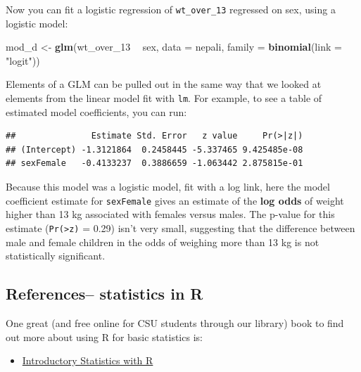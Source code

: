\documentclass[]{book}
\makeatletter
\newenvironment{Shaded}{\begin{snugshade}}{\end{snugshade}}
\newcommand{\KeywordTok}[1]{\textcolor[rgb]{0.13,0.29,0.53}{\textbf{#1}}}
\newcommand{\DataTypeTok}[1]{\textcolor[rgb]{0.13,0.29,0.53}{#1}}
\newcommand{\DecValTok}[1]{\textcolor[rgb]{0.00,0.00,0.81}{#1}}
\newcommand{\StringTok}[1]{\textcolor[rgb]{0.31,0.60,0.02}{#1}}
\newcommand{\OperatorTok}[1]{\textcolor[rgb]{0.81,0.36,0.00}{\textbf{#1}}}
\newcommand{\NormalTok}[1]{#1}
\providecommand{\tightlist}{%
  \setlength{\itemsep}{0pt}\setlength{\parskip}{0pt}}
\newenvironment{kframe}{%
\medskip{}
\setlength{\fboxsep}{.8em}
 \def\at@end@of@kframe{}%
 \ifinner\ifhmode%
  \def\at@end@of@kframe{\end{minipage}}%
  \begin{minipage}{\columnwidth}%
 \fi\fi%
 \def\FrameCommand##1{\hskip\@totalleftmargin \hskip-\fboxsep
 \colorbox{shadecolor}{##1}\hskip-\fboxsep
     \hskip-\linewidth \hskip-\@totalleftmargin \hskip\columnwidth}%
 \MakeFramed {\advance\hsize-\width
   \@totalleftmargin\z@ \linewidth\hsize
   \@setminipage}}%
 {\par\unskip\endMakeFramed%
 \at@end@of@kframe}
\renewenvironment{Shaded}{\begin{kframe}}{\end{kframe}}
\theoremstyle{definition}
\theoremstyle{definition}
\theoremstyle{definition}
\theoremstyle{remark}
\makeatother
\begin{document}
Now you can fit a logistic regression of \texttt{wt\_over\_13} regressed
on sex, using a logistic model:

\begin{Shaded}
\begin{Highlighting}[]
\NormalTok{mod_d <-}\StringTok{ }\KeywordTok{glm}\NormalTok{(wt_over_}\DecValTok{13} \OperatorTok{~}\StringTok{ }\NormalTok{sex, }\DataTypeTok{data =}\NormalTok{ nepali,}
             \DataTypeTok{family =} \KeywordTok{binomial}\NormalTok{(}\DataTypeTok{link =} \StringTok{"logit"}\NormalTok{))}
\end{Highlighting}
\end{Shaded}

Elements of a GLM can be pulled out in the same way that we looked at
elements from the linear model fit with \texttt{lm}. For example, to see
a table of estimated model coefficients, you can run:

\begin{Shaded}
\end{Shaded}

\begin{verbatim}
##               Estimate Std. Error   z value     Pr(>|z|)
## (Intercept) -1.3121864  0.2458445 -5.337465 9.425485e-08
## sexFemale   -0.4133237  0.3886659 -1.063442 2.875815e-01
\end{verbatim}

Because this model was a logistic model, fit with a log link, here the
model coefficient estimate for \texttt{sexFemale} gives an estimate of
the \textbf{log odds} of weight higher than 13 kg associated with
females versus males. The p-value for this estimate
(\texttt{Pr(\textgreater{}\textbar{}z\textbar{})} = 0.29) isn't very
small, suggesting that the difference between male and female children
in the odds of weighing more than 13 kg is not statistically
significant.

\subsection{References-- statistics in
R}\label{references-statistics-in-r}

One great (and free online for CSU students through our library) book to
find out more about using R for basic statistics is:

\begin{itemize}
\tightlist
\item
  \href{http://discovery.library.colostate.edu/Record/.b44705323}{Introductory
  Statistics with R}
\end{itemize}
\end{document}
